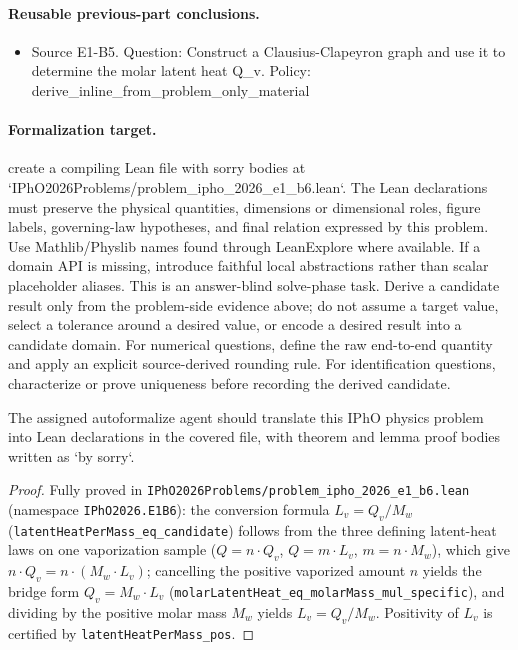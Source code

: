 \paragraph{Reusable previous-part conclusions.}
\begin{itemize}
\item Source E1-B5. Question: Construct a Clausius-Clapeyron graph and use it to determine the molar latent heat Q\_v. Policy: derive\_inline\_from\_problem\_only\_material
\end{itemize}

\paragraph{Formalization target.}
create a compiling Lean file with sorry bodies at `IPhO2026Problems/problem\_ipho\_2026\_e1\_b6.lean`.
The Lean declarations must preserve the physical quantities, dimensions or dimensional roles, figure labels, governing-law hypotheses, and final relation expressed by this problem.
Use Mathlib/Physlib names found through LeanExplore where available. If a domain API is missing, introduce faithful local abstractions rather than scalar placeholder aliases.
This is an answer-blind solve-phase task. Derive a candidate result only from the problem-side evidence above; do not assume a target value, select a tolerance around a desired value, or encode a desired result into a candidate domain.
For numerical questions, define the raw end-to-end quantity and apply an explicit source-derived rounding rule. For identification questions, characterize or prove uniqueness before recording the derived candidate.

\begin{theorem}
\label{thm:physics:ipho_2026_e1_b6:target}
\leanok
The assigned autoformalize agent should translate this IPhO physics problem into Lean declarations in the covered file, with theorem and lemma proof bodies written as `by sorry`.
\end{theorem}
\begin{proof}
\leanok
Fully proved in \texttt{IPhO2026Problems/problem\_ipho\_2026\_e1\_b6.lean}
(namespace \texttt{IPhO2026.E1B6}): the conversion formula
$L_v = Q_v / M_w$ (\texttt{latentHeatPerMass\_eq\_candidate}) follows from the
three defining latent-heat laws on one vaporization sample
($Q = n \cdot Q_v$, $Q = m \cdot L_v$, $m = n \cdot M_w$), which give
$n \cdot Q_v = n \cdot (M_w \cdot L_v)$; cancelling the positive vaporized
amount $n$ yields the bridge form $Q_v = M_w \cdot L_v$
(\texttt{molarLatentHeat\_eq\_molarMass\_mul\_specific}), and dividing by the
positive molar mass $M_w$ yields $L_v = Q_v / M_w$. Positivity of $L_v$ is
certified by \texttt{latentHeatPerMass\_pos}.
\end{proof}
